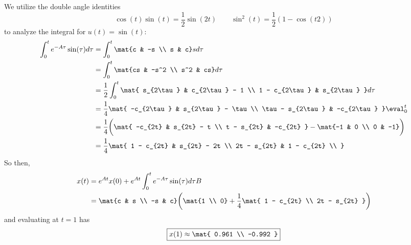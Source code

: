 \documentclass{homework}
\begin{document}
\begin{letterenum}
    \item We utilize the double angle identities
    \begin{equation}
        \cos(t)\sin(t) = \frac{1}{2}\sin(2t) \qquad
            \sin^2(t) = \frac{1}{2}(1 - \cos(t2))
    \end{equation}
    to analyze the integral for $u(t) = \sin(t)$:
    \begin{align}
        \int_{0}^{t} e^{-A\tau} \sin(\tau) d\tau
            &= \int_{0}^{t} \mat{c & -s \\ s & c} s d\tau \\
            &= \int_{0}^{t} \mat{cs & -s^2 \\ s^2 & cs} d\tau \\
            &= \frac{1}{2} \int_{0}^{t} \mat{
                s_{2\tau} & c_{2\tau} - 1 \\
                1 - c_{2\tau} & s_{2\tau}
            } d\tau \\ &= \frac{1}{4} \mat{ -c_{2\tau} & s_{2\tau} - \tau \\
                \tau - s_{2\tau} & -c_{2\tau}
            } \eval_0^t \\
            &= \frac{1}{4} \biggl(\mat{
                -c_{2t} & s_{2t} - t \\
                t - s_{2t} & -c_{2t}
            } - \mat{-1 & 0 \\ 0 & -1} \biggr)\\
            &= \frac{1}{4} \mat{
                1 - c_{2t} & s_{2t} - 2t \\
                2t - s_{2t} & 1 - c_{2t} \\
            }
    \end{align}
    So then,
    \begin{align}
        x(t) &= e^{At}x(0) + e^{At} \int_{0}^{t} e^{-A\tau}\sin(\tau)d\tau B \\
            &= \mat{c & s \\ -s & c} \biggr(\mat{1 \\ 0} + \frac{1}{4}\mat{
                1 - c_{2t} \\
                2t - s_{2t}
            }\biggl)
    \end{align}
    and evaluating at $t=1$ has
    \begin{equation}
        \boxed{x(1) \approx \mat{
            0.961 \\
            -0.992
        }}
    \end{equation}
        

\end{letterenum}
\end{document}
